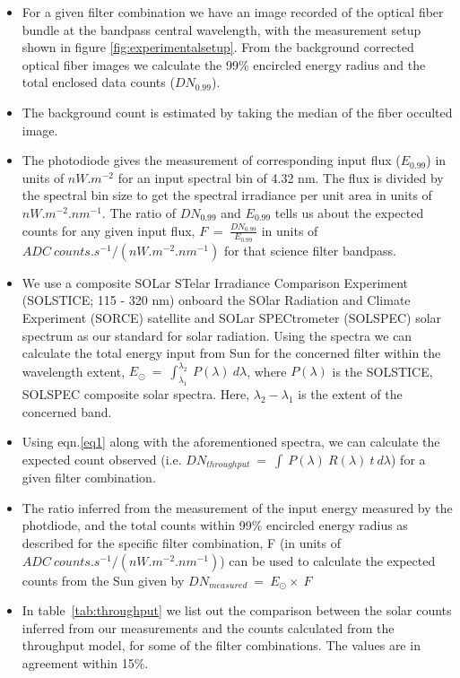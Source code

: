 \documentclass[12pt]{spieman}  %
\begin{document}
 \begin{itemize}
     \item For a given filter combination we have an image recorded of the optical fiber bundle at the bandpass central wavelength, with the measurement setup shown in figure \ref{fig:experimentalsetup}. From the background corrected optical fiber images we calculate the 99\% encircled energy radius and the total enclosed data counts ($DN_{0.99}$).
     \item The background count is estimated by taking the median of the fiber occulted image.
     
     \item The photodiode gives the measurement of corresponding input flux ($E_{0.99}$) in units of $nW.m^{-2}$ for an input spectral bin of 4.32 nm. The flux is divided by the spectral bin size to get the spectral irradiance per unit area in units of $nW.m^{-2}.nm^{-1}$. The ratio of $DN_{0.99}$ and ${E_{0.99}}$ tells us about the expected counts for any given input flux, $F~=~\frac{DN_{0.99}}{E_{0.99}}$ in units of $ADC~counts.s^{-1}/(nW.m^{-2}.nm^{-1})$ for that science filter bandpass.
     \item We use a composite SOLar STelar Irradiance Comparison Experiment (SOLSTICE; 115 - 320 nm) onboard the SOlar Radiation and Climate Experiment (SORCE) \cite{rottman05,harder05,mcclintock05} satellite and SOLar SPECtrometer (SOLSPEC) \cite{thuillier09} solar spectrum as our standard for solar radiation. Using the spectra we can calculate the total energy input from Sun for the concerned filter within the wavelength extent, $E_{\odot}~=~\int_{\lambda_{1}}^{\lambda_{2}}~P(\lambda)~d\lambda$, where $P(\lambda)$ is the SOLSTICE, SOLSPEC composite solar spectra. Here, $\lambda_{2}-\lambda_{1}$ is the extent of the concerned band.
     \item Using eqn.\ref{eq1} along with the aforementioned spectra, we can calculate the expected count observed (i.e. $DN_{throughput}~=~\int~P(\lambda)~R(\lambda)~t~d\lambda$) for a given filter combination.
     \item The ratio inferred from the measurement of the input energy measured by the photdiode, and the total counts within 99\% encircled energy radius as described for the specific filter combination, F (in units of $ADC~counts.s^{-1}/(nW.m^{-2}.nm^{-1})$) can be used to calculate the expected counts from the Sun given by $DN_{measured}~=~E_{\odot}\times~F$
     \item In table~\ref{tab:throughput} we list out the comparison between the solar counts inferred from our measurements and the counts calculated from the throughput model, for some of the filter combinations. The values are in agreement within 15\%.
 \end{itemize}
\end{document}
